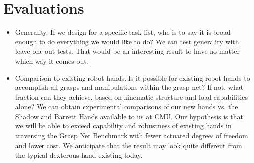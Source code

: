 \section{Evaluations}

\begin{itemize}

  \item Generality.   If we design for a specific task list, who is to say it is broad enough to do everything we would like to do?    We can test generality with leave one out tests.   That would be an interesting result to have no matter which way it comes out.

  \item Comparison to existing robot hands.    Is it possible for existing robot hands to accomplish all grasps and manipulations within the grasp net?   If not, what fraction can they achieve, based on kinematic structure and load capabilities alone?    We can obtain experimental comparisons of our new hands vs. the Shadow and Barrett Hands available to us at CMU.   Our hypothesis is that we will be able to exceed capability and robustness of existing hands in traversing the Grasp Net Benchmark with fewer actuated degrees of freedom and lower cost.   We anticipate that the result may look quite different from the typical dexterous hand existing today.

\end{itemize}